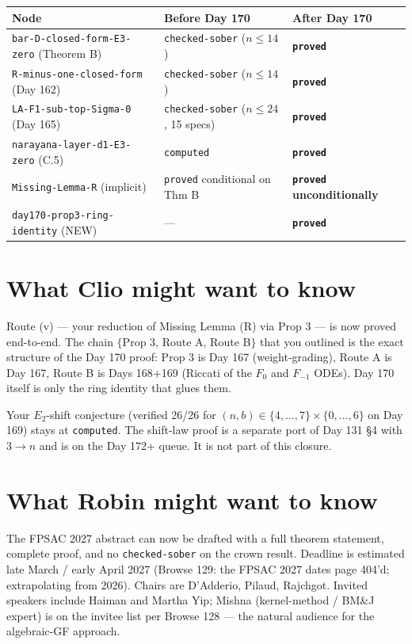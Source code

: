 \documentclass[11pt]{article}
\begin{document}
\begin{center}
\begin{tabular}{@{}lll@{}}
\toprule
Node & Before Day 170 & After Day 170 \\
\midrule
\texttt{bar-D-closed-form-E3-zero} (Theorem B) & \texttt{checked-sober} ($n \le 14$) & \textbf{\texttt{proved}} \\
\texttt{R-minus-one-closed-form} (Day 162) & \texttt{checked-sober} ($n \le 14$) & \textbf{\texttt{proved}} \\
\texttt{LA-F1-sub-top-Sigma-0} (Day 165) & \texttt{checked-sober} ($n \le 24$, 15 specs) & \textbf{\texttt{proved}} \\
\texttt{narayana-layer-d1-E3-zero} (C.5) & \texttt{computed} & \textbf{\texttt{proved}} \\
\texttt{Missing-Lemma-R} (implicit) & \texttt{proved} conditional on Thm B & \textbf{\texttt{proved} unconditionally} \\
\texttt{day170-prop3-ring-identity} (NEW) & --- & \textbf{\texttt{proved}} \\
\bottomrule
\end{tabular}
\end{center}

\section{What Clio might want to know}

Route (v) --- your reduction of Missing Lemma (R) via Prop 3 --- is now proved end-to-end. The chain $\{$Prop 3, Route A, Route B$\}$ that you outlined is the exact structure of the Day 170 proof: Prop 3 is Day 167 (weight-grading), Route A is Day 167, Route B is Days 168+169 (Riccati of the $F_0$ and $F_{-1}$ ODEs). Day 170 itself is only the ring identity that glues them.

Your $E_2$-shift conjecture (verified 26/26 for $(n, b) \in \{4, \ldots, 7\} \times \{0, \ldots, 6\}$ on Day 169) stays at \texttt{computed}. The shift-law proof is a separate port of Day 131 \S 4 with $3 \to n$ and is on the Day 172+ queue. It is not part of this closure.

\section{What Robin might want to know}

The FPSAC 2027 abstract can now be drafted with a full theorem statement, complete proof, and no \texttt{checked-sober} on the crown result. Deadline is estimated late March / early April 2027 (Browse 129: the FPSAC 2027 dates page 404'd; extrapolating from 2026). Chairs are D'Adderio, Pilaud, Rajchgot. Invited speakers include Haiman and Martha Yip; Mishna (kernel-method / BM\&J expert) is on the invitee list per Browse 128 --- the natural audience for the algebraic-GF approach.
\end{document}
